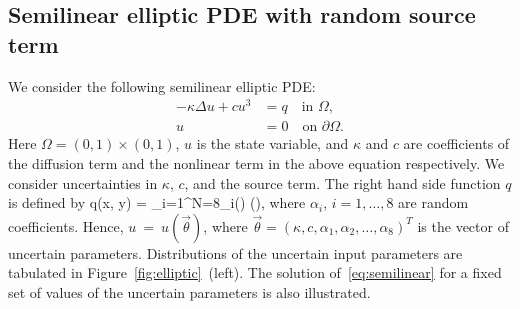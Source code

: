 \subsection{Semilinear elliptic PDE with random source term}

We consider the following semilinear elliptic PDE: 
\begin{equation}\label{eq:semilinear}
\begin{aligned}
-\kappa \Delta u + c u^3 &= q \quad \text{in } \Omega,\\
 u &= 0 \quad \text{on } \partial \Omega.
\end{aligned}
\end{equation}
Here $\Omega = (0, 1)\times(0,1)$, 
$u$ is the state variable, and $\kappa$ and $c$ are coefficients of the diffusion term
and the nonlinear term in the above equation respectively. 
We consider uncertainties in $\kappa$, $c$, and the source term. 
The right hand side function $q$ is defined by 
\be
q(x, y) = 
\sum\limits_{i=1}^{N=8}\alpha_i\sin\left(\right)
                               \cos\left(\right),
\label{eq:source}
\ee
where $\alpha_i$, $i = 1, \ldots, 8$ are random coefficients.
%
Hence, $u~=~u(\vec{\theta})$, where $\vec{\theta} = 
(\kappa,c,\alpha_1,\alpha_2,\ldots,\alpha_{8})^T$ is the vector
of uncertain parameters. Distributions of the uncertain
input parameters are tabulated in Figure~\ref{fig:elliptic}~(left).
The solution of~\eqref{eq:semilinear} for
a fixed set of values of the uncertain parameters is also 
illustrated.

